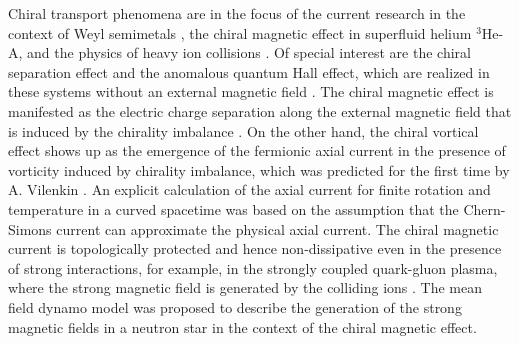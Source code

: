 \documentclass[12pt,prd,showkeys,amsmath,amssymb,nofootinbib]{revtex4-1}
\begin{document}
Chiral transport phenomena are in the focus of the current research in the context of Weyl semimetals \cite{HOSUR2013857,PhysRevB.88.125105,PhysRevB.88.125110}, the chiral magnetic effect \cite{Volovik} in superfluid helium $^{3}$He-A, and the physics of heavy ion collisions \cite{KHARZEEV20161}. Of special interest are the chiral separation effect \cite{PhysRevD.72.045011} and the anomalous quantum Hall effect, which are realized in these systems without an external magnetic field \cite{PhysRevB.86.115133}. The chiral magnetic effect is manifested as the electric charge separation along the external magnetic field that is induced by the chirality imbalance \cite{PhysRevD.22.3080,KHARZEEV2014133}. On the other hand, the chiral vortical effect \cite{Abramchuk} shows up as the emergence of the fermionic axial current in the presence of vorticity induced by chirality imbalance, which was predicted for the first time by A. Vilenkin \cite{PhysRevD.22.3080}. An explicit calculation \cite{PhysRevD.98.096011} of the axial current for finite rotation and temperature in a curved spacetime was based on the assumption that the Chern-Simons current can approximate the physical axial current. The chiral magnetic current is topologically protected and hence non-dissipative even in the presence of strong interactions, for example, in the strongly coupled quark-gluon plasma, where the strong magnetic field is generated by the colliding ions \cite{KHARZEEV20161}. The mean field dynamo model was proposed \cite{PhysRevD.101.083009} to describe the generation of the strong magnetic fields in a neutron star in the context of the chiral magnetic effect.
\end{document}
